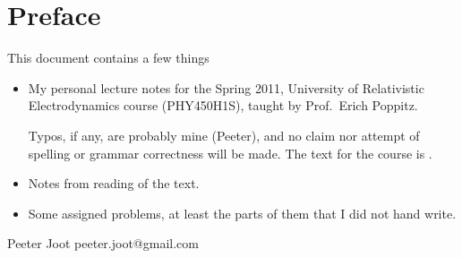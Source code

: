\chapter*{Preface}\normalsize

This document contains a few things

\begin{itemize}
\item My personal lecture notes for the Spring 2011, University of Relativistic Electrodynamics course (PHY450H1S), taught by Prof.\ Erich Poppitz.

Typos, if any, are probably mine (Peeter), and no claim nor attempt of spelling or grammar correctness will be made.  The text for the course is \cite{landau1980classical}.

\item Notes from reading of the text.

\item Some assigned problems, at least the parts of them that I did not hand write.  %
%
%
\end{itemize}

Peeter Joot  \quad peeter.joot@gmail.com 
